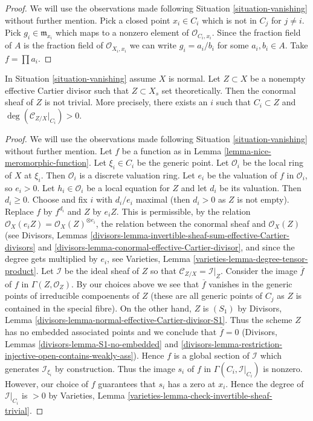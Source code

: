 \begin{proof}
We will use the observations made following Situation \ref{situation-vanishing}
without further mention. Pick a closed point $x_i \in C_i$ which is not in
$C_j$ for $j \not = i$. Pick $g_i \in \mathfrak m_{x_i}$ which maps to a
nonzero element of $\mathcal{O}_{C_i, x_i}$. Since the fraction field of $A$
is the fraction field of $\mathcal{O}_{X_i, x_i}$ we can write
$g_i = a_i/b_i$ for some $a_i, b_i \in A$. Take $f = \prod a_i$.
\end{proof}

\begin{lemma}
\label{lemma-nontrivial-normal-bundle}
In Situation \ref{situation-vanishing} assume $X$ is normal.
Let $Z \subset X$ be a nonempty effective Cartier divisor such that
$Z \subset X_s$ set theoretically.
Then the conormal sheaf of $Z$ is not trivial.
More precisely, there exists an $i$ such that $C_i \subset Z$
and $\deg(\mathcal{C}_{Z/X}|_{C_i}) > 0$.
\end{lemma}

\begin{proof}
We will use the observations made following Situation \ref{situation-vanishing}
without further mention. Let $f$ be a function as in
Lemma \ref{lemma-nice-meromorphic-function}.
Let $\xi_i \in C_i$ be the generic point. Let
$\mathcal{O}_i$ be the local ring of $X$ at $\xi_i$. Then $\mathcal{O}_i$
is a discrete valuation ring. Let $e_i$ be the valuation of
$f$ in $\mathcal{O}_i$, so $e_i > 0$. Let $h_i \in \mathcal{O}_i$ be a local
equation for $Z$ and let $d_i$ be its valuation. Then $d_i \geq 0$.
Choose and fix $i$ with $d_i/e_i$ maximal (then $d_i > 0$ as
$Z$ is not empty). Replace $f$ by $f^{d_i}$ and $Z$ by $e_iZ$.
This is permissible, by the relation
$\mathcal{O}_X(e_i Z) = \mathcal{O}_X(Z)^{\otimes e_i}$,
the relation between the conormal sheaf and $\mathcal{O}_X(Z)$
(see Divisors, Lemmas
\ref{divisors-lemma-invertible-sheaf-sum-effective-Cartier-divisors}
and \ref{divisors-lemma-conormal-effective-Cartier-divisor}, and
since the degree gets multiplied by $e_i$, see
Varieties, Lemma \ref{varieties-lemma-degree-tensor-product}.
Let $\mathcal{I}$ be the ideal sheaf of $Z$ so that
$\mathcal{C}_{Z/X} = \mathcal{I}|_Z$. Consider the image $\overline{f}$
of $f$ in $\Gamma(Z, \mathcal{O}_Z)$. By our choices above we see
that $\overline{f}$ vanishes in the generic points of irreducible
compoenents of $Z$ (these are all generic points of $C_j$ as $Z$ is
contained in the special fibre). On the other hand, $Z$ is $(S_1)$ by
Divisors, Lemma \ref{divisors-lemma-normal-effective-Cartier-divisor-S1}.
Thus the scheme $Z$ has no embedded associated points and
we conclude that $\overline{f} = 0$ (Divisors, Lemmas
\ref{divisors-lemma-S1-no-embedded} and
\ref{divisors-lemma-restriction-injective-open-contains-weakly-ass}).
Hence $f$ is a global section of $\mathcal{I}$
which generates $\mathcal{I}_{\xi_i}$ by construction.
Thus the image $s_i$ of $f$ in $\Gamma(C_i, \mathcal{I}|_{C_i})$ is nonzero.
However, our choice of $f$ guarantees that $s_i$ has a zero at $x_i$.
Hence the degree of $\mathcal{I}|_{C_i}$ is $>0$ by
Varieties, Lemma \ref{varieties-lemma-check-invertible-sheaf-trivial}.
\end{proof}

